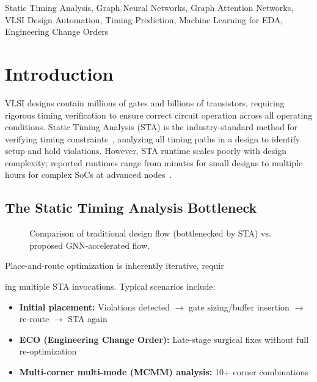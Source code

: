 \documentclass[10pt,twocolumn,journal]{IEEEtran}
\begin{document}
\begin{IEEEkeywords}
Static Timing Analysis, Graph Neural Networks, Graph Attention Networks, VLSI Design Automation, Timing Prediction, Machine Learning for EDA, Engineering Change Orders
\end{IEEEkeywords}

\section{Introduction}
\label{sec:intro}

 VLSI designs contain millions of gates and billions of transistors, requiring rigorous timing verification to ensure correct circuit operation across all operating conditions. Static Timing Analysis (STA) is the industry-standard method for verifying timing constraints~\cite{opensta}, analyzing all timing paths in a design to identify setup and hold violations. However, STA runtime scales poorly with design complexity; reported runtimes range from minutes for small designs to multiple hours for complex SoCs at advanced nodes~\cite{guo2022timingpredict,zhong2024preroutgnn}.

\subsection{The Static Timing Analysis Bottleneck}

\begin{figure}[t]
\centering
{}
\caption{Comparison of traditional design flow (bottlenecked by STA) vs. proposed GNN-accelerated flow.}
\label{fig:bottleneck}
\end{figure}

Place-and-route optimization is inherently iterative, requir

ing multiple STA invocations. Typical scenarios include:
\begin{itemize}
    \item \textbf{Initial placement:} Violations detected $\rightarrow$ gate sizing/buffer insertion $\rightarrow$ re-route $\rightarrow$ STA again
    \item \textbf{ECO (Engineering Change Order):} Late-stage surgical fixes without full re-optimization
    \item \textbf{Multi-corner multi-mode (MCMM) analysis:} 10+ corner combinations
\end{itemize}
\end{document}

